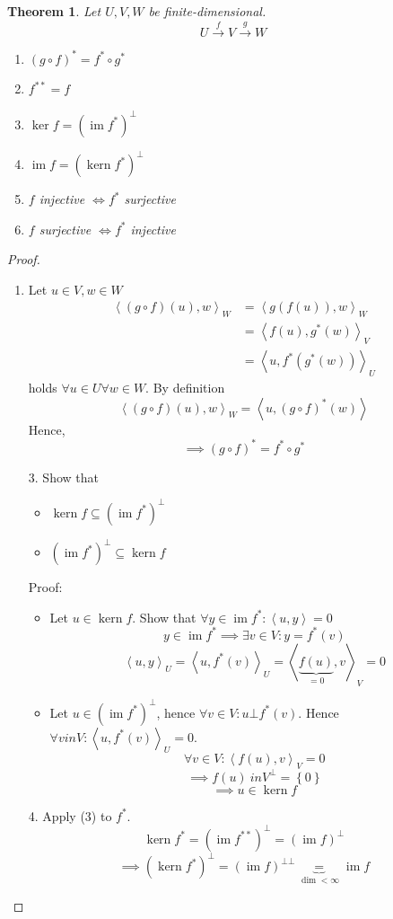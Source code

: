 \documentclass[a4paper]{article}
\newcounter{lecref}[section]
\numberwithin{lecref}{section}
\newtheorem{theorem}[lecref]{Theorem}
\newcommand{\set}[1]{\left\{#1\right\}}
\newcommand{\ip}[2]{\left\langle#1,#2\right\rangle} %
\DeclareMathOperator{\im}{im}
\DeclareMathOperator{\ke}{kern}
\begin{document}
\begin{theorem} %
  Let $U, V, W$ be finite-dimensional.
  \[ U \xrightarrow f V \xrightarrow g W \]
  \begin{enumerate}
    \item $(g \circ f)^* = f^* \circ g^*$
    \item $f^{**} = f$
    \item $\ker{f} = (\im{f^*})^\bot$
    \item $\im{f} = (\ke{f^*})^\bot$
    \item $f$ injective $\iff f^*$ surjective
    \item $f$ surjective $\iff f^*$ injective
  \end{enumerate}
\end{theorem}
\begin{proof}
  \begin{enumerate}
    \item Let $u \in V, w \in W$
      \begin{align*}
        \ip{(g \circ f)(u)}{w}_W &= \ip{g(f(u))}{w}_W \\
          &= \ip{f(u)}{g^*(w)}_V \\
          &= \ip{u}{f^*(g^*(w))}_U
      \end{align*}
      holds $\forall u \in U \forall w \in W$. By definition
      \[ \ip{(g \circ f)(u)}{w}_W = \ip{u}{(g \circ f)^*(w)} \]
      Hence,
      \[ \implies (g \circ f)^* = f^* \circ g^* \]
    \item[3.] Show that
      \begin{itemize}
        \item $\ke{f} \subseteq (\im{f^*})^\bot$
        \item $(\im{f^*})^\bot \subseteq \ke{f}$
      \end{itemize}
      Proof:
      \begin{itemize}
        \item Let $u \in \ke{f}$. Show that $\forall y \in \im{f^*}: \ip uy = 0$
          \[ y \in \im{f^*} \implies \exists v \in V: y = f^*(v) \]
          \[ {\ip uy}_U = \ip{u}{f^*(v)}_U = \ip{\underbrace{f(u)}_{=0}}{v}_V = 0 \]
        \item Let $u \in (\im{f^*})^\bot$, hence $\forall v \in V: u \bot f^*(v)$.
          Hence $\forall v in V: \ip{u}{f^*(v)}_U = 0$.
          \[ \forall v \in V: \ip{f(u)}{v}_V = 0 \]
          \[ \implies f(u) \ in V^\bot = \set{0} \]
          \[ \implies u \in \ke{f} \]
      \end{itemize}
    \item[4.]
      Apply (3) to $f^*$.
      \[ \ke{f^*} = (\im{f^{**}})^\bot = (\im{f})^\bot \]
      \[ \implies \left(\ke{f^*}\right)^\bot = (\im{f})^{\bot\bot} \underbrace{=}_{\dim < \infty} \im{f} \]
  \end{enumerate}
\end{proof}
\end{document}

